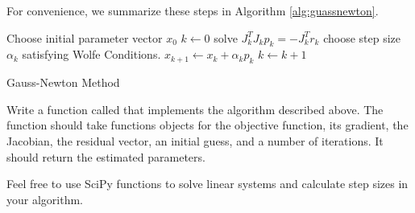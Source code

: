 For convenience, we summarize these steps in Algorithm \ref{alg:guassnewton}.
\begin{algorithm}
\begin{algorithmic}[1]
    \State \textrm{Choose initial parameter vector } $x_0$
    \State $k \gets 0$
        \State \textrm{solve } $J_k^TJ_kp_k = -J_k^Tr_k$
        \State \textrm{choose step size } $\alpha_k$ \textrm{ satisfying Wolfe Conditions.}
        \State $x_{k+1} \gets x_k + \alpha_kp_k$
        \State $k \gets k+1$
    \EndWhile
\EndProcedure
\end{algorithmic}
\caption{Gauss-Newton Method}
\label{alg:guassnewton}
\end{algorithm}

\begin{problem}
Write a function called  that implements the algorithm described above.
The function should take functions objects for the objective function, its gradient, the Jacobian,
the residual vector, an initial guess, and a number of iterations. It should return the estimated
parameters.

Feel free to use SciPy functions to solve linear systems and calculate step sizes in your algorithm.
\end{problem}

